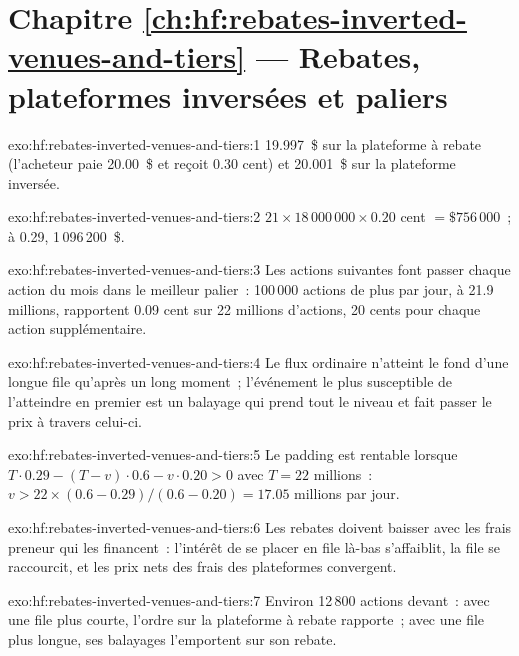 \section*{Chapitre \ref{ch:hf:rebates-inverted-venues-and-tiers} --- Rebates, plateformes inversées et paliers}

\begin{solution}{exo:hf:rebates-inverted-venues-and-tiers:1}
19.997~\$ sur la plateforme à rebate (l'acheteur paie 20.00~\$ et reçoit 0.30 cent) et 20.001~\$ sur la plateforme inversée.
\end{solution}

\begin{solution}{exo:hf:rebates-inverted-venues-and-tiers:2}
$21\times18\,000\,000\times0.20$ cent $=\$756\,000$~; à 0.29, 1\,096\,200~\$.
\end{solution}

\begin{solution}{exo:hf:rebates-inverted-venues-and-tiers:3}
Les actions suivantes font passer chaque action du mois dans le meilleur palier~: 100\,000 actions de plus par jour, à 21.9 millions, rapportent 0.09 cent sur 22 millions d'actions,
20 cents pour chaque action supplémentaire.
\end{solution}

\begin{solution}{exo:hf:rebates-inverted-venues-and-tiers:4}
Le flux ordinaire n'atteint le fond d'une longue file qu'après un long moment~; l'événement le plus susceptible de l'atteindre en premier est un balayage qui prend tout le niveau
et fait passer le prix à travers celui-ci.
\end{solution}

\begin{solution}{exo:hf:rebates-inverted-venues-and-tiers:5}
Le padding est rentable lorsque $T\cdot0.29-(T-v)\cdot0.6-v\cdot0.20>0$ avec $T=22$ millions~: $v>22\times(0.6-0.29)/(0.6-0.20)=17.05$ millions par jour.
\end{solution}

\begin{solution}{exo:hf:rebates-inverted-venues-and-tiers:6}
Les rebates doivent baisser avec les frais preneur qui les financent~: l'intérêt de se placer en file là-bas s'affaiblit, la file se raccourcit, et les prix nets des frais des
plateformes convergent.
\end{solution}

\begin{solution}{exo:hf:rebates-inverted-venues-and-tiers:7}
Environ 12\,800 actions devant~: avec une file plus courte, l'ordre sur la plateforme à rebate rapporte~; avec une file plus longue, ses balayages l'emportent sur son rebate.
\end{solution}

